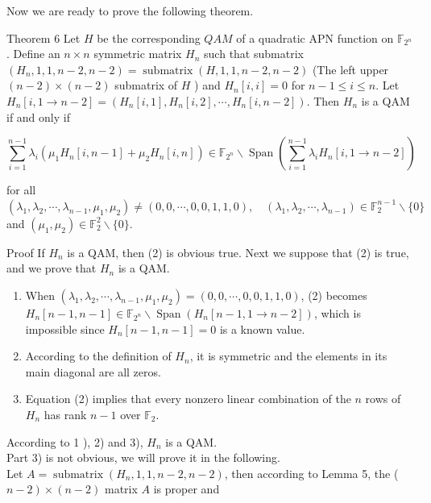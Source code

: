 \documentclass[10pt]{article}
\begin{document}
Now we are ready to prove the following theorem.

Theorem 6 Let $H$ be the corresponding $Q A M$ of a quadratic APN function on $\mathbb{F}_{2^{n}}$. Define an $n \times n$ symmetric matrix $H_{n}$ such that submatrix $\left(H_{n}, 1,1, n-2, n-2\right)=\operatorname{submatrix}(H, 1,1, n -2, n-2)$ (The left upper $(n-2) \times(n-2)$ submatrix of $H$ ) and $H_{n}[i, i]=0$ for $n-1 \leq i \leq n$. Let $H_{n}[i, 1 \rightarrow n-2]=\left(H_{n}[i, 1], H_{n}[i, 2], \cdots, H_{n}[i, n-2]\right)$. Then $H_{n}$ is a QAM if and only if


\begin{equation*}
\sum_{i=1}^{n-1} \lambda_{i}\left(\mu_{1} H_{n}[i, n-1]+\mu_{2} H_{n}[i, n]\right) \in \mathbb{F}_{2^{n}} \backslash \operatorname{Span}\left(\sum_{i=1}^{n-1} \lambda_{i} H_{n}[i, 1 \rightarrow n-2]\right) \tag{2}
\end{equation*}


for all $\left(\lambda_{1}, \lambda_{2}, \cdots, \lambda_{n-1}, \mu_{1}, \mu_{2}\right) \neq(0,0, \cdots, 0,0,1,1,0), \quad\left(\lambda_{1}, \lambda_{2}, \cdots, \lambda_{n-1}\right) \in \mathbb{F}_{2}^{n-1} \backslash\{0\} \quad$ and $\left(\mu_{1}, \mu_{2}\right) \in \mathbb{F}_{2}^{2} \backslash\{0\}$.

Proof If $H_{n}$ is a QAM, then (2) is obvious true. Next we suppose that (2) is true, and we prove that $H_{n}$ is a QAM.

\begin{enumerate}
  \item When $\left(\lambda_{1}, \lambda_{2}, \cdots, \lambda_{n-1}, \mu_{1}, \mu_{2}\right)=(0,0, \cdots, 0,0,1,1,0)$, (2) becomes $H_{n}[n-1, n-1] \in \mathbb{F}_{2^{n}} \backslash \operatorname{Span}\left(H_{n}[n-1,1 \rightarrow n-2]\right)$, which is impossible since $H_{n}[n -1, n-1]=0$ is a known value.
  \item According to the definition of $H_{n}$, it is symmetric and the elements in its main diagonal are all zeros.
  \item Equation (2) implies that every nonzero linear combination of the $n$ rows of $H_{n}$ has rank $n-1$ over $\mathbb{F}_{2}$.
\end{enumerate}

According to 1 ), 2) and 3), $H_{n}$ is a QAM.\\
Part 3) is not obvious, we will prove it in the following.\\
Let $A=\operatorname{submatrix}\left(H_{n}, 1,1, n-2, n-2\right)$, then according to Lemma 5, the ( $\left.n-2\right) \times(n-2)$ matrix $A$ is proper and
\end{document}
